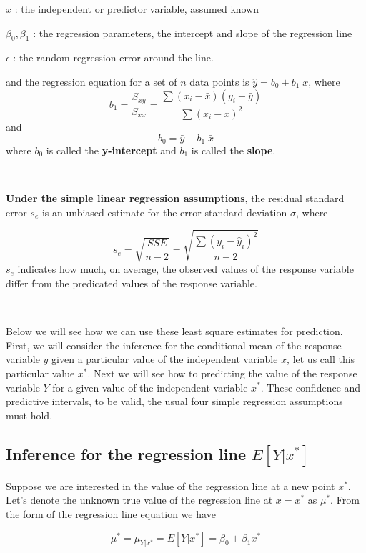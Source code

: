 \documentclass[
]{article}
\begin{document}
\(x\) : the independent or predictor variable, assumed known

\(\beta_0,\beta_1\) : the regression parameters, the intercept and slope
of the regression line

\(\epsilon\) : the random regression error around the line.

and the regression equation for a set of \(n\) data points is
\(\hat{y}=b_0+b_1\;x\), where
\[b_1=\frac{S_{xy}}{S_{xx}}=\frac{\sum (x_i-\bar{x})(y_i-\bar{y})}{\sum (x_i-\bar{x})^2}\]
and \[b_0=\bar{y}-b_1\; \bar{x}\] where \(b_0\) is called the
\textbf{y-intercept} and \(b_1\) is called the \textbf{slope}.

\(~\)

\textbf{Under the simple linear regression assumptions}, the residual
standard error \(s_e\) is an unbiased estimate for the error standard
deviation \(\sigma\), where

\[s_e=\sqrt{\frac{SSE}{n-2}}=\sqrt{\frac{\sum(y_i-\hat{y}_i)^2}{n-2}} \]
\(s_e\) indicates how much, on average, the observed values of the
response variable differ from the predicated values of the response
variable.

\(~\)

Below we will see how we can use these least square estimates for
prediction. First, we will consider the inference for the conditional
mean of the response variable \(y\) given a particular value of the
independent variable \(x\), let us call this particular value \(x^*\).
Next we will see how to predicting the value of the response variable
\(Y\) for a given value of the independent variable \(x^*\). These
confidence and predictive intervals, to be valid, the usual four simple
regression assumptions must hold.

\hypertarget{inference-for-the-regression-line-eleftyxright}{%
\subsection{\texorpdfstring{Inference for the regression line
\(E\left[Y|x^*\right]\)}{Inference for the regression line E\textbackslash left{[}Y\textbar x\^{}*\textbackslash right{]}}}\label{inference-for-the-regression-line-eleftyxright}}

Suppose we are interested in the value of the regression line at a new
point \(x^*\). Let's denote the unknown true value of the regression
line at \(x=x^*\) as \(\mu^*\). From the form of the regression line
equation we have

\[\mu^*=\mu_{Y|x^*}=E\left[Y|x^*\right]=\beta_0+\beta_1 x^*\]
\end{document}
